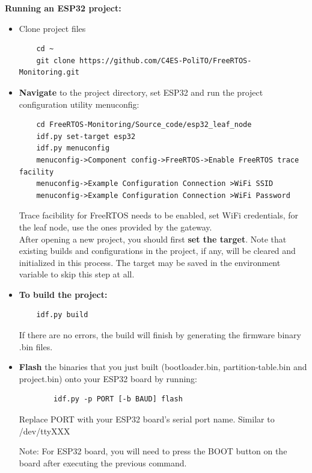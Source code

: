\textbf{Running an ESP32 project:}

\begin{itemize}
    \item Clone project files 
    \begin{verbatim}
    cd ~
    git clone https://github.com/C4ES-PoliTO/FreeRTOS-Monitoring.git
    \end{verbatim}

    
    \item \textbf{Navigate} to the project directory, set ESP32 and run the project configuration utility menuconfig:
    \begin{verbatim}
    cd FreeRTOS-Monitoring/Source_code/esp32_leaf_node
    idf.py set-target esp32
    idf.py menuconfig
    menuconfig->Component config->FreeRTOS->Enable FreeRTOS trace facility
    menuconfig->Example Configuration Connection >WiFi SSID  
    menuconfig->Example Configuration Connection >WiFi Password
    \end{verbatim}

    Trace facibility for FreeRTOS needs to be enabled, set WiFi credentials, for the leaf node, use the ones provided by the gateway.\\
    
    After opening a new project, you should first \textbf{set the target}. Note that existing builds and configurations in the project, if any, will be cleared and initialized in this process. The target may be saved in the environment variable to skip this step at all.
    
    \item \textbf{To build the project:}
    \begin{verbatim}
    idf.py build
    \end{verbatim}

    If there are no errors, the build will finish by generating the firmware binary .bin files.

    \item \textbf{Flash} the binaries that you just built (bootloader.bin, partition-table.bin and project.bin) onto your ESP32 board by running:
    \begin{verbatim}
        idf.py -p PORT [-b BAUD] flash
    \end{verbatim}
    
    Replace PORT with your ESP32 board’s serial port name. Similar to /dev/ttyXXX

    Note: For ESP32 board, you will need to press the BOOT button on the board after executing the previous command.\\
    

\end{itemize}
